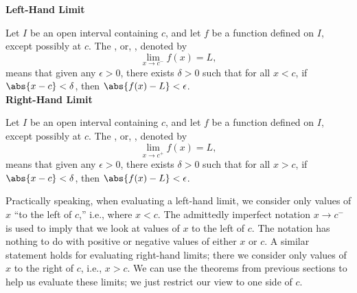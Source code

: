 {\textbf{Left-Hand Limit} 

Let $I$ be an open interval containing $c$, and let $f$ be a function defined on $I$, except possibly at $c$. 
The , or, , denoted by  
\[\displaystyle \lim_{x\rightarrow c^-} f(x) = L,\]
means that given any $\epsilon > 0$, there exists $\delta > 0$ such that for all $x< c$,  
if  $\abs{x-c}<\delta$, then $\abs{f(x)-L}<\epsilon$.\\

\textbf{Right-Hand Limit}

Let $I$ be an open interval containing $c$, and let $f$ be a function defined on $I$, except possibly at $c$. 
The , or, , denoted by  
\[\displaystyle \lim_{x\rightarrow c^+} f(x) = L,\]
means that given any $\epsilon > 0$, there exists $\delta > 0$ such that for all $x> c$,  
if  $\abs{x-c}<\delta$, then $\abs{f(x)-L}<\epsilon$.
}
\restoreboxwidth
\normalsize

Practically speaking, when evaluating a left-hand limit, we consider only values of $x$ ``to the left of $c$,'' i.e., where $x<c$. The admittedly imperfect notation $x\to c^-$ is used to imply that we look at values of $x$ to the left of $c$. The notation has nothing to do with positive or negative values of either $x$ or $c$. A similar statement holds for evaluating right-hand limits; there we consider only values of $x$ to the right of $c$, i.e., $x>c$. We can use the theorems from previous sections to help us evaluate these limits; we just restrict our view to one side of $c$.

